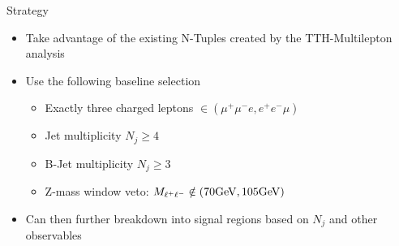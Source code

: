 
\begin{frame}{Strategy}
  \small
  \begin{itemize}
    \item Take advantage of the existing N-Tuples created by the TTH-Multilepton analysis
    \item Use the following baseline selection
    \begin{itemize}
      \item Exactly three charged leptons $\in(\mu^+\mu^-e, e^+e^-\mu)$
      \item Jet multiplicity $N_j \ge 4$
      \item B-Jet multiplicity $N_j \ge 3$
      \item Z-mass window veto: $M_{\ell^+\ell^-} \notin (70\si{\giga\electronvolt},105\si{\giga\electronvolt})$
    \end{itemize}
    \item Can then further breakdown into signal regions based on $N_j$ and other observables
  \end{itemize}
\end{frame}
